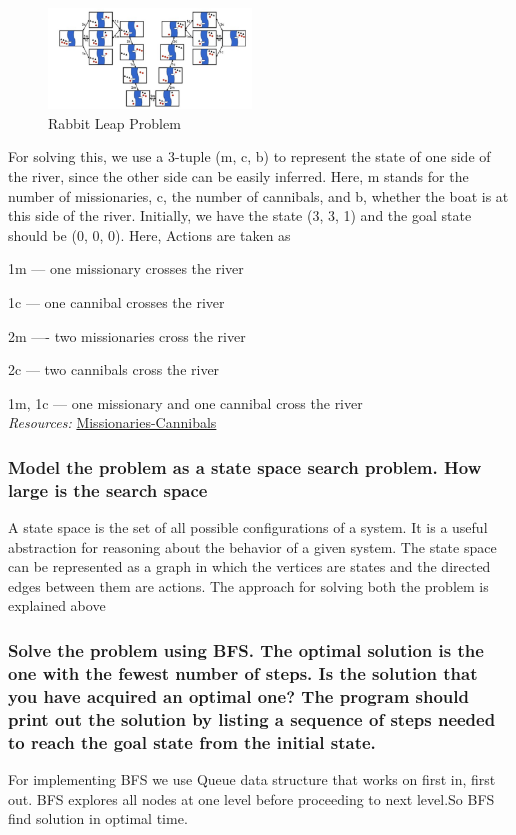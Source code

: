 \documentclass[15pt,journal]{IEEEtran}
\begin{document}
\begin{figure}[H]%
\begin {center}
\includegraphics[width=0.48\textwidth]{images/cannibal.jpg}
\caption{Rabbit Leap Problem} %
\label{fig:ecg}
\end {center}
\end{figure}

For solving this, we use a 3-tuple (m, c, b) to represent the state of one side of the river, since the other side can be easily inferred. Here, m stands for the number of missionaries, c, the number of cannibals, and b, whether the boat is at this side of the river. Initially, we have the state (3, 3, 1) and the goal state should be (0, 0, 0).
Here, Actions are taken as

1m --- one missionary crosses the river

1c --- one cannibal crosses the river

2m ---- two missionaries cross the river

2c --- two cannibals cross the river

1m, 1c --- one missionary and one cannibal cross the river\\
\emph{Resources:} \href{https://cpentalk.com/201/missionaries-cannibals-problem-usually-missionaries-cannibals}{Missionaries-Cannibals}




\subsubsection{Model the problem as a state space search problem.  How large is the search space}
A state space is the set of all possible configurations of a system. It is a useful abstraction for reasoning about the behavior of a given system. The state space can be represented as a graph in which the vertices are states and the directed edges between them are actions. The approach for solving both the problem is explained above

\subsubsection{Solve the problem using BFS.  The optimal solution is the one with the fewest number of steps. Is the solution that you have acquired an optimal one? The program should print out the solution by listing a sequence of steps needed to reach the goal state from the initial state. } 
For implementing BFS we use Queue data structure that  works on 
first in, first out. BFS explores all nodes at one level before
proceeding to next level.So BFS find solution in optimal time.
\end{document}
